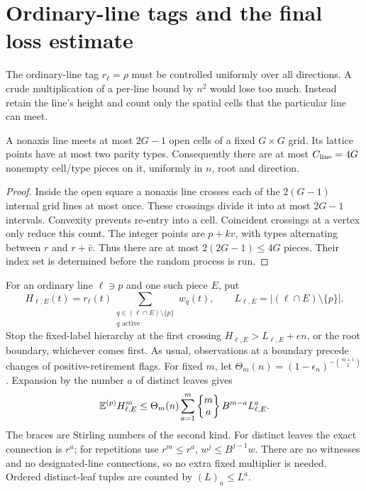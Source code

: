 \section{Ordinary-line tags and the final loss estimate}\label{sec:closing}

The ordinary-line tag \(r_\ell=\rho\) must be controlled uniformly
over all directions. A crude multiplication of a per-line bound by
\(n^2\) would lose too much. Instead retain the line's height and
count only the spatial cells that the particular line can meet.

\begin{lemma}\label{lem:cells}
A nonaxis line meets at most \(2G-1\) open cells of a fixed
\(G\times G\) grid. Its lattice points have at most two parity types.
Consequently there are at most \(C_{\rm line}=4G\) nonempty cell/type
pieces on it, uniformly in \(n\), root and direction.
\end{lemma}
\begin{proof}
Inside the open square a nonaxis line crosses each of the
\(2(G-1)\) internal grid lines at most once. These crossings divide
it into at most \(2G-1\) intervals. Convexity prevents re-entry
into a cell. Coincident crossings at a vertex only reduce this count.
The integer points are \(p+kv\), with types alternating between
\(r\) and \(r+\bar v\). Thus there are at most
\(2(2G-1)\le4G\) pieces. Their index set is determined before the
random process is run.
\end{proof}

For an ordinary line \(\ell\ni p\) and one such piece \(E\), put
\[
 H_{\ell,E}(t)=r_\ell(t)
       \sum_{\substack{q\in(\ell\cap E)\setminus\{p\}\\q\text{ active}}}w_q(t),
 \qquad L_{\ell,E}=| (\ell\cap E)\setminus\{p\}|.
\]
Stop the fixed-label hierarchy at the first crossing
\(H_{\ell,E}>L_{\ell,E}+en\), or the root boundary, whichever
comes first. As usual, observations at a boundary precede changes
of positive-retirement flags. For fixed \(m\), let
\(\Theta_m(n)=(1-\epsilon_n)^{-\binom{m+1}2}\).
Expansion by the number \(a\) of distinct leaves gives
\begin{equation}\label{eq:tagmoment}
 \mathbb E^{(p)}H_{\ell,E}^m
 \le\Theta_m(n)\sum_{a=1}^m
 \left\{\begin{matrix}m\\a\end{matrix}\right\}
 B^{m-a}L_{\ell,E}^a.
\end{equation}
The braces are Stirling numbers of the second kind. For distinct
leaves the exact connection is \(r^a\); for repetitions use
\(r^m\le r^a\), \(w^j\le B^{j-1}w\). There are no witnesses and
no designated-line connections, so no extra fixed multiplier is
needed. Ordered distinct-leaf tuples are counted by
\((L)_a\le L^a\).

